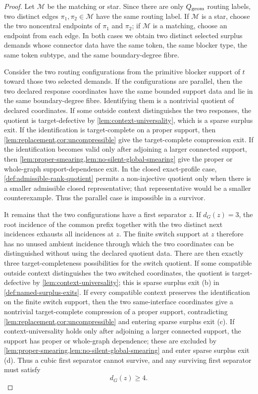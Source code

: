 \documentclass[11pt]{article}
\begin{document}
\begin{proof}
Let \(\mathcal M\) be the matching or star.  Since there are only
\(Q_{\rm geom}\) routing labels, two distinct edges
\(\pi_1,\pi_2\in\mathcal M\) have the same routing label.  If \(\mathcal M\) is
a star, choose the two noncentral endpoints of \(\pi_1\) and \(\pi_2\); if
\(\mathcal M\) is a matching, choose an endpoint from each edge.  In both cases
we obtain two distinct selected surplus demands whose connector data have the
same token, the same blocker type, the same token subtype, and the same
boundary-degree fibre.

Consider the two routing configurations from the primitive blocker support of \(t\) toward those two
selected demands.  If the configurations are parallel, then the two declared response
coordinates have the same bounded support data and lie in the same
boundary-degree fibre.  Identifying them is a nontrivial quotient of declared
coordinates.  If some outside context distinguishes the two responses, the
quotient is target-defective by \cref{lem:context-universality}, which is a
sparse surplus exit.  If the identification is target-complete on a proper
support, then \cref{lem:replacement,cor:uncompressible} give the
target-complete compression exit.  If the identification becomes valid only
after adjoining a larger connected support, then
\cref{lem:proper-smearing,lem:no-silent-global-smearing} give the proper or
whole-graph support-dependence exit.  In the closed exact-profile case,
\cref{def:admissible-rank-quotient} permits a non-injective quotient only when
there is a smaller admissible closed representative; that representative would
be a smaller counterexample.  Thus the parallel case is impossible in a
survivor.

It remains that the two configurations have a first separator \(z\).  If \(d_G(z)=3\),
the root incidence of the common prefix together with the two distinct next
incidences exhausts all incidences at \(z\).  The finite switch support at
\(z\) therefore has no unused ambient incidence through which the two
coordinates can be distinguished without using the declared quotient data.
There are then exactly three target-completeness possibilities for the switch
quotient.  If some compatible outside context distinguishes the two switched
coordinates, the quotient is target-defective by
\cref{lem:context-universality}; this is sparse surplus exit (b) in
\cref{def:named-surplus-exits}.  If every compatible context preserves the
identification on the finite switch support, then the two same-interface
coordinates give a nontrivial target-complete compression of a proper support,
contradicting \cref{lem:replacement,cor:uncompressible} and entering sparse
surplus exit (c).  If context-universality holds only after adjoining a larger
connected support, the support has proper or whole-graph dependence; these are
excluded by \cref{lem:proper-smearing,lem:no-silent-global-smearing} and enter
sparse surplus exit (d).  Thus a cubic first separator cannot survive, and any
surviving first separator must satisfy
\[
d_G(z)\ge4 .
\]


\end{proof}
\end{document}

